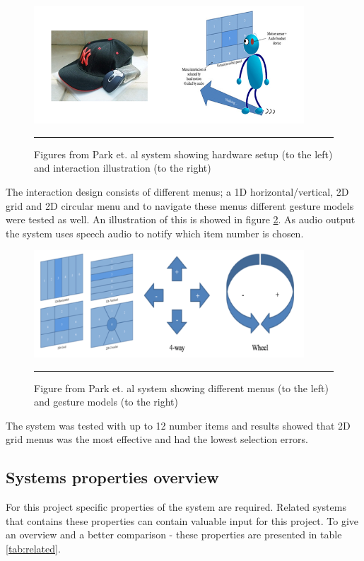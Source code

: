 \begin{figure}[htbp]
	\centering
		\includegraphics[width=0.9\textwidth,height=\textheight,keepaspectratio]{./Figures/park-system.png}
		\rule{35em}{0.5pt}
	\caption[Park system]{Figures from Park et. al \cite{park_gaze-directed_2011} system showing hardware setup (to the left) and interaction illustration (to the right)}
	\label{fig:park}
\end{figure}

The interaction design consists of different menus; a 1D horizontal/vertical, 2D grid and 2D circular menu and to navigate these menus different gesture models were tested as well. An illustration of this is showed in figure \ref{fig:park-menus}. As audio output the system uses speech audio to notify which item number is chosen.

\begin{figure}[htbp]
	\centering
		\includegraphics[width=0.9\textwidth,height=\textheight,keepaspectratio]{./Figures/park-menus.png}
		\rule{35em}{0.5pt}
	\caption[Park menus]{Figure from Park et. al \cite{park_gaze-directed_2011} system showing different menus (to the left) and gesture models (to the right)}
	\label{fig:park-menus}
\end{figure}

The system was tested with up to 12 number items and results showed that 2D grid menus was the most effective and had the lowest selection errors.


\subsection{Systems properties overview}
For this project specific properties of the system are required. Related systems that contains these properties can contain valuable input for this project. To give an overview and a better comparison - these properties are presented in table \ref{tab:related}.


